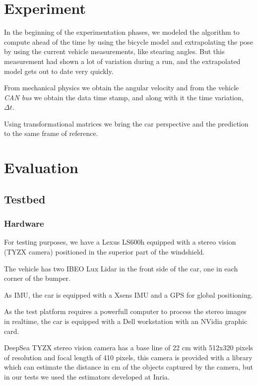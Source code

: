 \section{Experiment}

In the beginning of the experimentation phases, we modeled the algorithm to compute ahead of the time by using the bicycle model and extrapolating the pose by using the current vehicle measurements, like stearing angles. But this measurement had shown a lot of variation during a run, and the extrapolated model gets out to date very quickly.

From mechanical physics we obtain the angular velocity and from the vehicle \emph{CAN bus} we obtain the data time stamp, and along with it the time variation, $\Delta t$.

Using transformational matrices we bring the car perspective \cite{iyengar1991autonomous} and the prediction to the same frame of reference.

\section{Evaluation}


\subsection{Testbed}

\subsubsection*{Hardware}

For testing purposes, we have a Lexus LS600h equipped with a stereo vision (TYZX camera) positioned in the superior part of the windshield.

The vehicle has two IBEO Lux Lidar in the front side of the car, one in each corner of the bumper.

As IMU, the car is equipped with a Xsens IMU and a GPS for global positioning.

As the test platform requires a powerfull computer to process the stereo images in realtime, the car is equipped with a Dell workstation with an NVidia graphic card.

DeepSea TYZX stereo vision camera has a base line of 22 cm with 512x320 pixels of resolution and focal length of 410 pixels, this camera is provided with a library which can estimate the distance in cm of the objects captured by the camera, but in our tests we used the estimators developed at Inria\cite{PERROLLAZ-2010-493397}.

